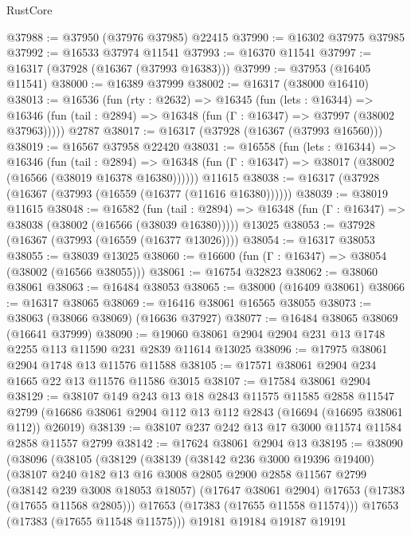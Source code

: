 \begin{lexlean}{RustCore}
\begin{coremodule}
@37988 := @37950 (@37976 @37985) @22415
@37990 := @16302 @37975 @37985
@37992 := @16533 @37974 @11541
@37993 := @16370 @11541
@37997 := @16317 (@37928 (@16367 (@37993 @16383)))
@37999 := @37953 (@16405 @11541)
@38000 := @16389 @37999
@38002 := @16317 (@38000 @16410)
@38013 := @16536
    (fun (rty : @2632) =>
    @16345
      (fun (lets : @16344) =>
      @16346 (fun (tail : @2894) => @16348 (fun (Γ : @16347) => @37997 (@38002 @37963)))))
    @2787
@38017 := @16317 (@37928 (@16367 (@37993 @16560)))
@38019 := @16567 @37958 @22420
@38031 := @16558
    (fun (lets : @16344) =>
    @16346
      (fun (tail : @2894) =>
      @16348 (fun (Γ : @16347) => @38017 (@38002 (@16566 (@38019 @16378 @16380))))))
    @11615
@38038 := @16317 (@37928 (@16367 (@37993 (@16559 (@16377 (@11616 @16380))))))
@38039 := @38019 @11615
@38048 := @16582
    (fun (tail : @2894) => @16348 (fun (Γ : @16347) => @38038 (@38002 (@16566 (@38039 @16380)))))
    @13025
@38053 := @37928 (@16367 (@37993 (@16559 (@16377 @13026))))
@38054 := @16317 @38053
@38055 := @38039 @13025
@38060 := @16600 (fun (Γ : @16347) => @38054 (@38002 (@16566 @38055)))
@38061 := @16754 @32823
@38062 := @38060 @38061
@38063 := @16484 @38053
@38065 := @38000 (@16409 @38061)
@38066 := @16317 @38065
@38069 := @16416 @38061 @16565 @38055
@38073 := @38063 (@38066 @38069) (@16636 @37927)
@38077 := @16484 @38065 @38069 (@16641 @37999)
@38090 := @19060 @38061 @2904 @2904 @231 @13 @1748 @2255 @113 @11590 @231 @2839 @11614 @13025
@38096 := @17975 @38061 @2904 @1748 @13 @11576 @11588
@38105 := @17571 @38061 @2904 @234 @1665 @22 @13 @11576 @11586 @3015
@38107 := @17584 @38061 @2904
@38129 := @38107
    @149
    @243
    @13
    @18
    @2843
    @11575
    @11585
    @2858
    @11547
    @2799
    (@16686 @38061 @2904 @112 @13 @112 @2843 (@16694 (@16695 @38061 @112)) @26019)
@38139 := @38107 @237 @242 @13 @17 @3000 @11574 @11584 @2858 @11557 @2799
@38142 := @17624 @38061 @2904 @13
@38195 := @38090
    (@38096
      (@38105
        (@38129
          (@38139
            (@38142 @236 @3000 @19396 @19400)
            (@38107
              @240
              @182
              @13
              @16
              @3008
              @2805
              @2900
              @2858
              @11567
              @2799
              (@38142 @239 @3008 @18053 @18057)
              (@17647 @38061 @2904)
              @17653
              (@17383 (@17655 @11568 @2805)))
            @17653
            (@17383 (@17655 @11558 @11574)))
          @17653
          (@17383 (@17655 @11548 @11575)))
        @19181
        @19184
        @19187
        @19191

\end{coremodule}
\end{lexlean}

